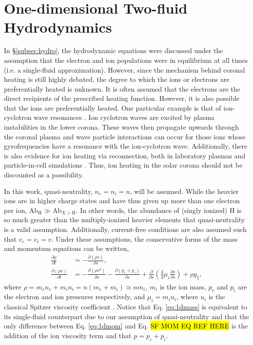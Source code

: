 \section{One-dimensional Two-fluid Hydrodynamics}
\label{sec:1dhydro}
%
\par In \S\ref{subsec:hydro}, the hydrodynamic equations were discussed under the assumption that the electron and ion populations were in equilibrium at all times (i.e. a single-fluid approximation). However, since the mechanism behind coronal heating is still highly debated, the degree to which the ions or electrons are preferentially heated is unknown. It is often assumed that the electrons are the direct recipients of the prescribed heating function. However, it is also possible that the ions are preferentially heated. One particular example is that of ion-cyclotron wave resonances \citep{markovskii_intermittent_2004}. Ion cyclotron waves are excited by plasma instabilities in the lower corona. These waves then propagate upwards through the coronal plasma and wave particle interactions can occur for those ions whose gyrofrequencies have a resonance with the ion-cyclotron wave. Additionally, there is also evidence for ion heating via reconnection, both in laboratory plasmas and particle-in-cell simulations \citep{ono_ion_1996,yoo_bulk_2014,drake_onset_2014}. Thus, ion heating in the solar corona should not be discounted as a possibility.
%
\par In this work, quasi-neutrality, $n_e=n_i=n$, will be assumed. While the heavier ions are in higher charge states and have thus given up more than one electron per ion, $\mathrm{Ab}_{\mathrm{H}}\gg\mathrm{Ab}_{X>\mathrm{H}}$. In other words, the abundance of (singly ionized) H is so much greater than the multiply-ionized heavier elements that quasi-neutrality is a valid assumption. Additionally, current-free conditions are also assumed such that $v_e=v_i=v$. Under these assumptions, the conservative forms of the mass and momentum equations can be written,
\begin{align}
	\frac{\partial\rho}{\partial t} &= -\frac{\partial(\rho v)}{\partial s} \label{eq:1dmass}, \\[0.5em]
	\frac{\partial(\rho v)}{\partial t} &= -\frac{\partial(\rho v^2)}{\partial s}-\frac{\partial(p_e + p_i)}{\partial s} + \frac{\partial}{\partial s}\left(\frac{4}{3}\mu_i\frac{\partial v}{\partial s}\right) + \rho g_{\parallel}, \label{eq:1dmom}
\end{align}
where $\rho=m_en_e + m_in_i=n(m_e+m_i)\approx nm_i$, $m_i$ is the ion mass, $p_e$ and $p_i$ are the electron and ion pressures respectively, and $\mu_i=m_iu_i$, where $u_i$ is the classical Spitzer viscosity coefficient \citep{bradshaw_influence_2013}. Notice that Eq. \ref{eq:1dmass} is equivalent to its single-fluid counterpart due to our assumption of quasi-neutrality and that the only difference between Eq. \ref{eq:1dmom} and Eq. \hl{SF MOM EQ REF HERE} is the addition of the ion viscosity term and that $p=p_e+p_i$.

